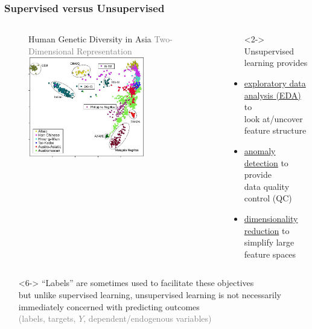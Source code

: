 \documentclass[xcolor={dvipsnames}]{beamer}
\begin{document}
\frame
{
 \frametitle{Supervised versus Unsupervised}

\begin{columns}
\begin{column}{.5\textwidth}
\begin{figure}
\centering
Human Genetic Diversity in Asia
\textcolor{gray}{Two-Dimensional Representation} 
\includegraphics[width=2in]{stuffs/dna_pca.jpg}
\end{figure}
\end{column}
\begin{column}{.65\textwidth}
\begin{itemize}
\itemsep.16em 
\item[]<2-> Unsupervised learning provides
\item[]
\item<3-> \underline{exploratory data analysis (EDA)} to\\
look at/uncover feature structure
\item[]
\item<4->  \underline{anomaly detection} to provide \\ 
 data quality control (QC)
\item[]
\item<5-> \underline{dimensionality reduction} to \\
 simplify large feature spaces 
\end{itemize}
\end{column}
\end{columns}

\begin{itemize}
\item[]
\item[]<6-> ``Labels'' are sometimes used to facilitate these objectives\\
but unlike supervised learning, unsupervised learning is not 
necessarily immediately concerned with predicting outcomes\\
\textcolor{gray}{ (labels, targets, $Y$, dependent/endogenous variables)}
\end{itemize}

}
\end{document}
